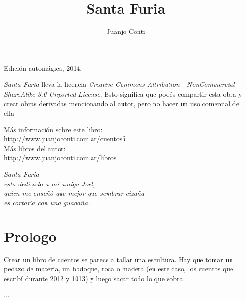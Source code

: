 \documentclass[12pt,twoside,openright,a5paper]{book}
\title{Santa Furia}
\author{Juanjo Conti}
\date{}
\begin{document}
\pagestyle{plain}

\maketitle


\thispagestyle{empty}
\noindent
Edición automágica, 2014.\\

\vspace{0.5cm}

\noindent
\emph{Santa Furia} lleva la licencia 
\emph{Creative Commons Attribution - NonCommercial - ShareAlike 3.0 Unported License}.
Esto significa que podés compartir esta obra y crear obras derivadas
mencionando al autor, pero no ha\-cer un uso comercial de ella.

\vfill

\noindent
Más información sobre este libro:\\
http://www.juanjoconti.com.ar/cuentos5\\

\noindent
Más libros del autor:\\
http://www.juanjoconti.com.ar/libros

\cleardoublepage

\noindent
\begin{flushright}
\emph{
\emph{Santa Furia}\\
está dedicado a mi amigo Joel,\\
quien me enseñó que mejor que sembrar cizaña\\
es cortarla con una guadaña.
}
\end{flushright}

\cleardoublepage

\renewcommand*\contentsname{Índice}

\tableofcontents

\chapter*{Prologo}

Crear un libro de cuentos se parece a tallar una escultura. 
Hay que tomar un pedazo de materia, un bodoque, roca o madera 
(en este caso, los cuentos que escribí durante 2012 y 1013)
y luego sacar todo lo que sobra.

...

 
 
 
 
 
 
 
 
 
 
 
 
 
 


\end{document}
